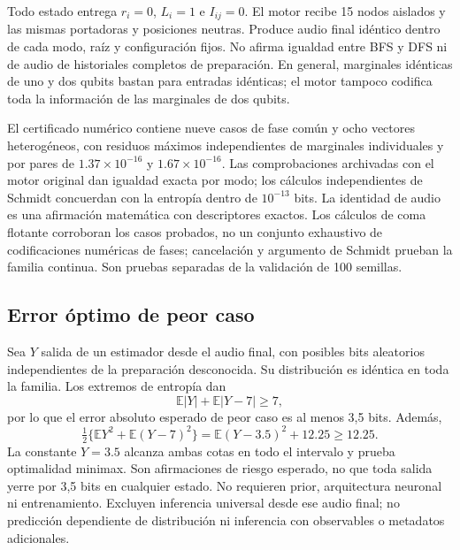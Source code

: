 \documentclass[11pt,a4paper]{article}
\begin{document}
Todo estado entrega $r_i=0$, $L_i=1$ e $I_{ij}=0$. El motor recibe 15 nodos aislados y las mismas portadoras y posiciones neutras. Produce audio final idéntico dentro de cada modo, raíz y configuración fijos. No afirma igualdad entre BFS y DFS ni de audio de historiales completos de preparación. En general, marginales idénticas de uno y dos qubits bastan para entradas idénticas; el motor tampoco codifica toda la información de las marginales de dos qubits.

El certificado numérico contiene nueve casos de fase común y ocho vectores heterogéneos, con residuos máximos independientes de marginales individuales y por pares de $1.37\times10^{-16}$ y $1.67\times10^{-16}$. Las comprobaciones archivadas con el motor original dan igualdad exacta por modo; los cálculos independientes de Schmidt concuerdan con la entropía dentro de $10^{-13}$ bits. La identidad de audio es una afirmación matemática con descriptores exactos. Los cálculos de coma flotante corroboran los casos probados, no un conjunto exhaustivo de codificaciones numéricas de fases; cancelación y argumento de Schmidt prueban la familia continua. Son pruebas separadas de la validación de 100 semillas.

\subsection{Error óptimo de peor caso}
Sea $Y$ salida de un estimador desde el audio final, con posibles bits aleatorios independientes de la preparación desconocida. Su distribución es idéntica en toda la familia. Los extremos de entropía dan
\[
\mathbb E|Y|+\mathbb E|Y-7|\ge7,
\]
por lo que el error absoluto esperado de peor caso es al menos 3,5 bits. Además,
\[
\tfrac12\{\mathbb E Y^2+\mathbb E(Y-7)^2\}=\mathbb E(Y-3.5)^2+12.25\ge12.25.
\]
La constante $Y=3.5$ alcanza ambas cotas en todo el intervalo y prueba optimalidad minimax. Son afirmaciones de riesgo esperado, no que toda salida yerre por 3,5 bits en cualquier estado. No requieren prior, arquitectura neuronal ni entrenamiento. Excluyen inferencia universal desde ese audio final; no predicción dependiente de distribución ni inferencia con observables o metadatos adicionales.
\end{document}
